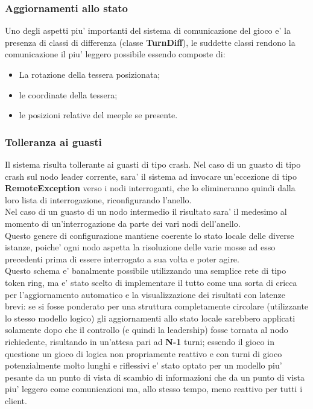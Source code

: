 \subsubsection{Aggiornamenti allo stato}
	Uno degli aspetti piu' importanti del sistema di comunicazione del gioco
	e' la presenza di classi di differenza (classe \textbf{TurnDiff}), le
	suddette classi rendono la comunicazione il piu' leggero possibile
	essendo composte di:
	\begin{itemize}
		\item La rotazione della tessera posizionata;
		\item le coordinate della tessera;
		\item le posizioni relative del meeple se presente.
	\end{itemize}

\subsubsection{Tolleranza ai guasti}
	Il sistema risulta tollerante ai guasti di tipo crash.
	Nel caso di un guasto di tipo crash sul nodo leader corrente, sara' il
	sistema ad invocare un'eccezione di tipo \textbf{RemoteException} verso
	i nodi interroganti, che lo elimineranno quindi dalla loro lista di
	interrogazione, riconfigurando l'anello.\\
	Nel caso di un guasto di un nodo intermedio il risultato sara' il
	medesimo al momento di un'interrogazione da parte dei vari nodi
	dell'anello.\\
	Questo genere di configurazione mantiene coerente lo stato locale delle
	diverse istanze, poiche' ogni nodo aspetta la risoluzione delle varie
	mosse ad esso precedenti prima di essere interrogato a sua volta e poter
	agire.\\
	Questo schema e' banalmente possibile utilizzando una semplice rete di
	tipo token ring, ma e' stato scelto di implementare il tutto come una
	sorta di cricca per l'aggiornamento automatico e la visualizzazione dei
	risultati con latenze brevi: se si fosse ponderato per una struttura
	completamente circolare (utilizzante lo stesso modello logico) gli
	aggiornamenti allo stato locale sarebbero applicati solamente dopo che
	il controllo (e quindi la leadership) fosse tornata al nodo richiedente,
	risultando in un'attesa pari ad \textbf{N-1} turni; essendo il gioco
	in questione un gioco di logica non propriamente reattivo e con turni
	di gioco potenzialmente molto lunghi e riflessivi e' stato optato
	per un modello piu' pesante da un punto di vista
	di scambio di informazioni che da un punto di vista piu' leggero come
	comunicazioni ma, allo stesso tempo, meno reattivo per tutti i client.

